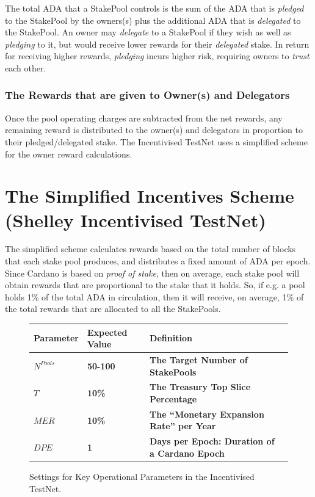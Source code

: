 \documentclass[11pt,a4paper,dvipsnames,twosided,final]{article}
\newcommand{\ada}{ADA{}}
\newcommand{\cardano}[1]{Cardano}
\begin{document}
\noindent
The total \ada{} that a StakePool controls is the sum of the \ada{} that is \emph{pledged} to the StakePool by the owners(s) plus
the additional \ada{} that is \emph{delegated} to the StakePool.  An owner may \emph{delegate} to a StakePool if
they wish as well as \emph{pledging} to it, but would receive lower rewards for their \emph{delegated} stake.
In return for receiving higher rewards, \emph{pledging} incurs higher risk, requiring owners to \emph{trust} each other.


\subsubsection*{The Rewards that are given to Owner(s) and Delegators}

Once the pool operating charges are subtracted from the net rewards, any remaining reward is distributed to the owner(s) and delegators
in proportion to their pledged/delegated stake.  The Incentivised TestNet uses a simplified scheme for the owner reward calculations.


\clearpage
\section{The Simplified Incentives Scheme (Shelley Incentivised TestNet)}
\label{sec:TestNet}

The simplified scheme calculates rewards based on the total number of blocks that each stake pool produces,
and distributes a fixed amount of \ada{} per epoch.
Since \cardano{} is based on \emph{proof of stake}, then on average, each stake pool will obtain
rewards that are proportional to the stake that it holds.  So, if e.g. a pool holds 1\% of the total
\ada{} in circulation, then it will receive, on average, 1\% of the total rewards that are allocated to all the
StakePools.

\begin{figure}[h!]
\begin{center}
\begin{tabular}{||l|l|p{10cm}|l||}
  \hline \hline
\textbf{Parameter} & \textbf{Expected Value} & \textbf{Definition} \\\hline
\textbf{\color{green} $N^{\textit{Pools}}$} & \textbf{\color{green} 50-100} &\textbf{\color{green}  The Target Number of StakePools} \\\hline
\textbf{\color{green} $T$} & \textbf{\color{green} 10\%} & \textbf{\color{green} The Treasury Top Slice Percentage} \\\hline
\textbf{\color{green} $\textit{MER}$} & \textbf{\color{green} 10\%}&  \textbf{\color{green} The ``Monetary Expansion Rate'' per Year}\\\hline
\textbf{\color{green} $\textit{DPE}$} & \textbf{\color{green} 1} & \textbf{\color{green}  Days per Epoch: Duration of a \cardano{} Epoch} \\\hline
  \hline
\end{tabular}
\end{center}
\caption{Settings for Key Operational Parameters in the Incentivised TestNet.}
\end{figure}
\end{document}
